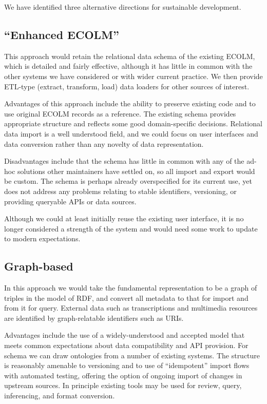 \documentclass[sigconf]{acmart}
\begin{document}
\begin{sloppypar}
  We have identified three alternative directions for sustainable
  development.
  
  \subsection{``Enhanced ECOLM''}

  This approach would retain the relational data schema of the
  existing ECOLM, which is detailed and fairly effective, although it
  has little in common with the other systems we have considered or
  with wider current practice. We then provide ETL-type (extract,
  transform, load) data loaders for other sources of interest.

  Advantages of this approach include the ability to preserve existing
  code and to use original ECOLM records as a reference. The existing
  schema provides appropriate structure and reflects some good
  domain-specific decisions. Relational data import is a well
  understood field, and we could focus on user interfaces and data
  conversion rather than any novelty of data representation.

  Disadvantages include that the schema has little in common with any
  of the ad-hoc solutions other maintainers have settled on, so all
  import and export would be custom. The schema is perhaps already
  overspecified for its current use, yet does not address any problems
  relating to stable identifiers, versioning, or providing queryable
  APIs or data sources.

  Although we could at least initially reuse the existing user
  interface, it is no longer considered a strength of the system and
  would need some work to update to modern expectations.

  \subsection{Graph-based}

  In this approach we would take the fundamental representation to be
  a graph of triples in the model of RDF, and convert all metadata to
  that for import and from it for query. External data such as
  transcriptions and multimedia resources are identified by
  graph-relatable identifiers such as URIs.

  Advantages include the use of a widely-understood and accepted model
  that meets common expectations about data compatibility and API
  provision. For schema we can draw ontologies from a number of
  existing systems. The structure is reasonably amenable to versioning
  and to use of ``idempotent'' import flows with automated testing,
  offering the option of ongoing import of changes in upstream
  sources. In principle existing tools may be used for review, query,
  inferencing, and format conversion.


\end{sloppypar}
\end{document}
